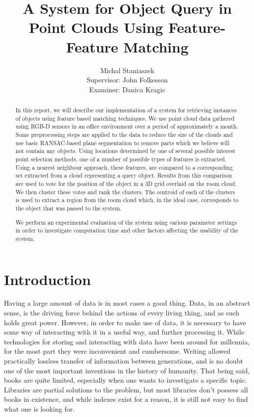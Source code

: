\documentclass[11pt,a4paper]{kth-mag}
\author{Michal Staniaszek \\  \vskip 3cm Supervisor: John Folkesson \\ Examiner: Danica Kragic}
\title{A System for Object Query in Point Clouds Using Feature-Feature Matching}
\begin{document}
\maketitle
\begin{abstract}
  In this report, we will describe our implementation of a system for retrieving
  instances of objects using feature based matching techniques. We use point
  cloud data gathered using RGB-D sensors in an office environment over a period
  of approximately a month. Some preprocessing steps are applied to the data to
  reduce the size of the clouds and use basic RANSAC-based plane segmentation to
  remove parts which we believe will not contain any objects. Using locations
  determined by one of several possible interest point selection methods, one of
  a number of possible types of features is extracted. Using a nearest neighbour
  approach, these features, are compared to a corresponding set extracted from a
  cloud representing a query object. Results from this comparison are used to
  vote for the position of the object in a 3D grid overlaid on the room cloud.
  We then cluster these votes and rank the clusters. The centroid of each of the
  clusters is used to extract a region from the room cloud which, in the ideal
  case, corresponds to the object that was passed to the system.

  We perform an experimental evaluation of the system using various parameter
  settings in order to investigate computation time and other factors affecting
  the usability of the system.
\end{abstract}
\tableofcontents
\chapter{Introduction}
Having a large amount of data is in most cases a good thing. Data, in an
abstract sense, is the driving force behind the actions of every living thing,
and as such holds great power. However, in order to make use of data, it is
necessary to have some way of interacting with it in a useful way, and further
processing it. While technologies for storing and interacting with data have
been around for millennia, for the most part they were inconvenient and
cumbersome. Writing allowed practically lossless transfer of information between
generations, and is no doubt one of the most important inventions in the history
of humanity. That being said, books are quite limited, especially when one wants
to investigate a specific topic. Libraries are partial solutions to the problem,
but most libraries don't possess all books in existence, and while indexes exist
for a reason, it is still not easy to find what one is looking for.
\end{document}
